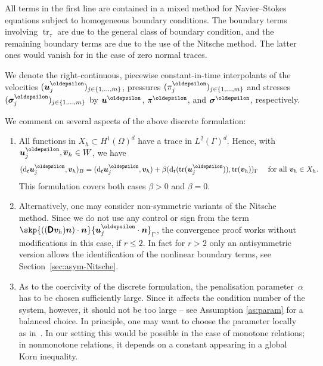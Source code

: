 \documentclass[reqno,a4paper]{amsart}
\def\tens#1{\pmb{\mathsf{#1}}}
\def\vec#1{\boldsymbol{#1}}
\def\tr{\mathop{\mathrm{tr}}\nolimits}
\def\d{{\rm d}}
\def\difft{\d_t}
\def\bn{\vec{n}}
\def\bu{\vec{u}}
\def\bv{\vec{v}}
\def\bsigma{\vec{\sigma}}
\def\BD{\tens{D}}
\def\Xh{X_{h}}
\def\discr{\oldepsilon}
\begin{document}
All terms in the first line are contained in a mixed method for Navier--Stokes equations subject to homogeneous boundary conditions. 
The boundary terms involving $\tr_\tau$ are due to the general class of boundary condition, and the remaining boundary terms are due to the use of the Nitsche method. 
The latter ones would vanish for in the case of zero normal traces. 
 
We denote the right-continuous, piecewise constant-in-time interpolants of the velocities $(\bu^{\discr}_j)_{j \in \{1,\ldots, m\}}$, pressures $(\pi^{\discr}_j)_{j \in \{1,\ldots, m\}}$ and stresses $(\bsigma^\discr_j)_{j \in \{1,\ldots, m\}}$  by $\bu^{\discr}$, $\pi^{\discr}$, and 
$\bsigma^\discr$, respectively. 

\begin{remark}\label{rem:TabeaRockt} We comment on several aspects of the above discrete formulation: 
	\begin{enumerate}[label = (\alph*)]
		\item\label{itm:Tabea1}
		All functions in $ \Xh\subset H^1(\Omega)^{d}$ have a trace in $L^2(\Gamma)^{d}$. Hence, with ${\bu}^{\discr}_j,\overline{\bv}_h \in W$, we have 
		\begin{align*} 
			(\difft {\bu}^{\discr}_j,{\bv}_h)_B 
			= 	(\difft {\bu}^{\discr}_j,{\bv}_h) + \beta(\difft( \tr(\bu^{\discr}_j)),\tr(\bv_h))_{\Gamma} \quad \text{ for all } \bv_h \in \Xh. 
		\end{align*}
		This formulation covers both cases $\beta> 0$ and $\beta = 0$. 
		\item\label{itm:Tabea2}
		Alternatively, one may consider non-symmetric variants of the Nitsche method. 
		Since we do not use any control or sign from the term $\skp{ \left(( \BD \bv_h) \bn \right) \cdot \bn }{ \bu_j^{\discr} \cdot \bn }_{\Gamma}$, 
		the convergence proof works without modifications in this case, if $r\leq2$. 
        In fact for $r>2$ only an antisymmetric version allows the identification of the nonlinear boundary terms, see Section~\ref{sec:asym-Nitsche}. 
		\item\label{itm:Tabea3} 
		 
		As to the coercivity of the discrete formulation, the penalisation parameter~$\alpha$ has to be chosen sufficiently large. Since it affects the condition number of the system, however, it should not be too large -- see Assumption \ref{as:param} for a balanced choice. 
		In principle, one may want to choose the parameter locally as  in~\cite{BringmannCarstensenStreitberger2024}. 
		In our setting this would be possible in the case of monotone relations;  in nonmonotone relations, it depends on a constant appearing in a global Korn inequality.
	\end{enumerate}
\end{remark}
\end{document}
